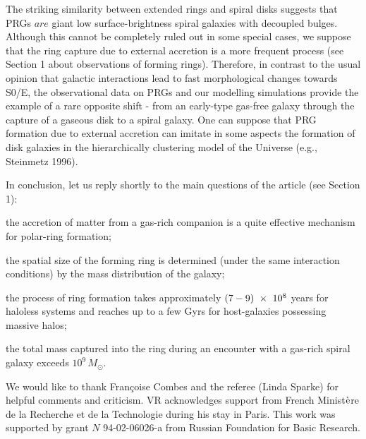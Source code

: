 The striking similarity between extended rings and spiral disks  
suggests that PRGs $are$ giant low surface-brightness spiral 
galaxies with decoupled bulges. Although this cannot be completely 
ruled out in some special cases, we suppose that the ring capture 
due to external accretion is a more frequent process 
(see Section 1 about observations of forming rings). 
Therefore, in contrast to the usual opinion that galactic 
interactions lead to fast morphological changes towards S0/E, 
the observational data on PRGs and our modelling simulations 
provide the example of a rare opposite shift - from an early-type 
gas-free galaxy through the capture of a gaseous disk to a spiral galaxy. 
One can suppose that PRG formation due to external accretion 
can imitate in some aspects the formation of disk galaxies in 
the hierarchically clustering model of the Universe (e.g., Steinmetz 1996). 

In conclusion, let us reply shortly to the main questions of the article 
(see Section 1):

the accretion of matter from a gas-rich companion is a 
quite effective mechanism for polar-ring formation;

the spatial size of the forming ring is determined (under the same 
interaction conditions) by the mass distribution of the galaxy;

the process of ring formation takes approximately 
$\rm (7-9)~\times~10^{8}$ years for haloless systems and reaches up to  
a few Gyrs for host-galaxies possessing massive halos; 

the total mass captured into the ring 
during an encounter with a gas-rich spiral galaxy exceeds 
$10^{9}\,M_{\odot}$.

\acknowledgements
{We would like to thank Fran\c coise Combes and the referee
(Linda Sparke) for helpful comments
and criticism. VR acknowledges support from French 
Minist$\grave{\rm e}$re de la Recherche et de la Technologie during his stay
in Paris. This work was supported by grant $N$ 94-02-06026-a from Russian 
Foundation for Basic Research.}

